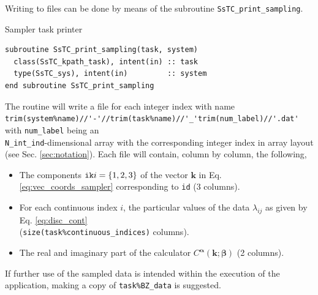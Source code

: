 \documentclass[10pt,a4paper]{article}
\begin{document}
Writing to files can be done by means of the subroutine \verb|SsTC_print_sampling|.
\begin{codebox}{Sampler task printer}
\begin{lstlisting}[caption={Interface of the sampling task printer.},captionpos=b]
subroutine SsTC_print_sampling(task, system)
  class(SsTC_kpath_task), intent(in) :: task
  type(SsTC_sys), intent(in)         :: system
end subroutine SsTC_print_sampling
\end{lstlisting}
\end{codebox}
The routine will write a file for each integer index with name \\ \verb|trim(system%name)//'-'//trim(task%name)//'_'trim(num_label)//'.dat'| with \verb|num_label| being an \\ \verb|N_int_ind|-dimensional array with the corresponding integer index in array layout (see Sec. \ref{sec:notation}). Each file will contain, column by column, the following,
\begin{tcolorbox}
\begin{itemize}
\item The components $\verb|ik|i=\{1, 2, 3\}$ of the vector $\bm{k}$ in Eq. \eqref{eq:vec_coords_sampler} corresponding to \verb|id| (3 columns).
\item For each continuous index $i$, the particular values of the data $\lambda_{ij}$ as given by Eq. \eqref{eq:disc_cont} \\ (\verb|size(task%continuous_indices)| columns).
\item The real and imaginary part of the calculator $C^{\bm{\alpha}}(\bm{k}; \bm{\beta})$ (2 columns).
\end{itemize}
\end{tcolorbox}
If further use of the sampled data is intended within the execution of the application, making a copy of \verb|task%BZ_data| is suggested.
\end{document}
